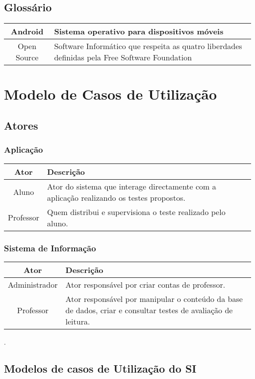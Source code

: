 \documentclass[a4paper,titlepage]{article}
\begin{document}
				\subsection{Glossário}
				\begin{tabular}{|c|p{8cm}|}
				\hline Android & Sistema operativo para dispositivos móveis \\ 
				\hline Open Source  & Software Informático que respeita as quatro liberdades definidas pela Free Software Foundation \\ 
				\hline 
				\end{tabular} 
				
				\newpage
				
				\section{Modelo de Casos de Utilização}
					\subsection{Atores}
						\subsubsection{Aplicação}
							\begin{tabular}{|c|p{9cm}|}
								\hline Ator & Descrição \\ 
								\hline  Aluno  & Ator do sistema que interage directamente com a aplicação realizando os testes propostos. \\ 
								\hline  Professor  & Quem distribui e supervisiona o teste realizado pelo aluno. \\ 
								\hline 
							\end{tabular} 
						\subsubsection{Sistema de Informação}
							\begin{tabular}{|c|p{8cm}|}
								\hline Ator & Descrição \\ 
								\hline  Administrador  & Ator responsável por criar contas de professor.    \\ 
								\hline  Professor  & Ator responsável por manipular o conteúdo da base de dados, criar e consultar testes de avaliação de leitura. \\ 
								\hline 
							\end{tabular}.
							
				\subsection{Modelos de casos de Utilização do SI}
						
									
							

				
				
		
		
\end{document}
